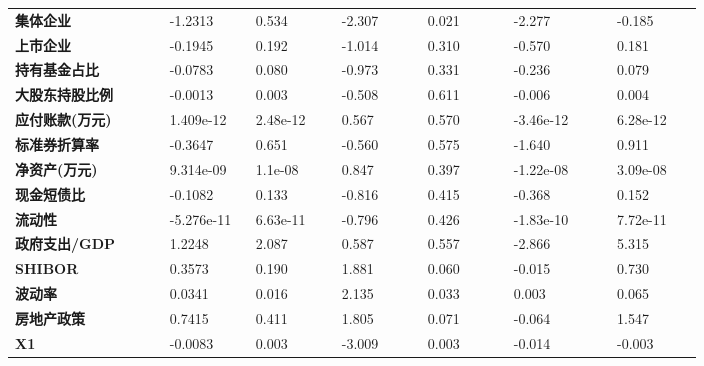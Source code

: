 \begin{center}
\begin{longtable}{p{0.18\linewidth}p{0.1\linewidth}p{0.1\linewidth}p{0.1\linewidth}p{0.1\linewidth}p{0.12\linewidth}p{0.1\linewidth}}
		\textbf{集体企业}       & -1.2313       & 0.534            & -2.307     & 0.021               & -2.277          & -0.185          \\
		\textbf{上市企业}       & -0.1945       & 0.192            & -1.014     & 0.310               & -0.570          & 0.181           \\
		\textbf{持有基金占比}   & -0.0783       & 0.080            & -0.973     & 0.331               & -0.236          & 0.079           \\
		\textbf{大股东持股比例} & -0.0013       & 0.003            & -0.508     & 0.611               & -0.006          & 0.004           \\
		\textbf{应付账款(万元)} & 1.409e-12     & 2.48e-12         & 0.567      & 0.570               & -3.46e-12       & 6.28e-12        \\
		\textbf{标准券折算率}   & -0.3647       & 0.651            & -0.560     & 0.575               & -1.640          & 0.911           \\
		\textbf{净资产(万元)}   & 9.314e-09     & 1.1e-08          & 0.847      & 0.397               & -1.22e-08       & 3.09e-08        \\
		\textbf{现金短债比}     & -0.1082       & 0.133            & -0.816     & 0.415               & -0.368          & 0.152           \\
		\textbf{流动性}         & -5.276e-11    & 6.63e-11         & -0.796     & 0.426               & -1.83e-10       & 7.72e-11        \\
		\textbf{政府支出/GDP}   & 1.2248        & 2.087            & 0.587      & 0.557               & -2.866          & 5.315           \\
		\textbf{SHIBOR}         & 0.3573        & 0.190            & 1.881      & 0.060               & -0.015          & 0.730           \\
		\textbf{波动率}         & 0.0341        & 0.016            & 2.135      & 0.033               & 0.003           & 0.065           \\
		\textbf{房地产政策}     & 0.7415        & 0.411            & 1.805      & 0.071               & -0.064          & 1.547           \\
		\textbf{X1}             & -0.0083       & 0.003            & -3.009     & 0.003               & -0.014          & -0.003          \\

\end{longtable}
\end{center}
